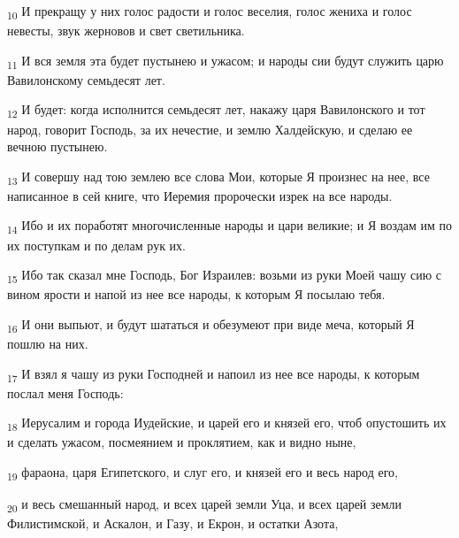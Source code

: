 \begin{tcolorbox}
\textsubscript{10} И прекращу у них голос радости и голос веселия, голос жениха и голос невесты, звук жерновов и свет светильника.
\end{tcolorbox}
\begin{tcolorbox}
\textsubscript{11} И вся земля эта будет пустынею и ужасом; и народы сии будут служить царю Вавилонскому семьдесят лет.
\end{tcolorbox}
\begin{tcolorbox}
\textsubscript{12} И будет: когда исполнится семьдесят лет, накажу царя Вавилонского и тот народ, говорит Господь, за их нечестие, и землю Халдейскую, и сделаю ее вечною пустынею.
\end{tcolorbox}
\begin{tcolorbox}
\textsubscript{13} И совершу над тою землею все слова Мои, которые Я произнес на нее, все написанное в сей книге, что Иеремия пророчески изрек на все народы.
\end{tcolorbox}
\begin{tcolorbox}
\textsubscript{14} Ибо и их поработят многочисленные народы и цари великие; и Я воздам им по их поступкам и по делам рук их.
\end{tcolorbox}
\begin{tcolorbox}
\textsubscript{15} Ибо так сказал мне Господь, Бог Израилев: возьми из руки Моей чашу сию с вином ярости и напой из нее все народы, к которым Я посылаю тебя.
\end{tcolorbox}
\begin{tcolorbox}
\textsubscript{16} И они выпьют, и будут шататься и обезумеют при виде меча, который Я пошлю на них.
\end{tcolorbox}
\begin{tcolorbox}
\textsubscript{17} И взял я чашу из руки Господней и напоил из нее все народы, к которым послал меня Господь:
\end{tcolorbox}
\begin{tcolorbox}
\textsubscript{18} Иерусалим и города Иудейские, и царей его и князей его, чтоб опустошить их и сделать ужасом, посмеянием и проклятием, как и видно ныне,
\end{tcolorbox}
\begin{tcolorbox}
\textsubscript{19} фараона, царя Египетского, и слуг его, и князей его и весь народ его,
\end{tcolorbox}
\begin{tcolorbox}
\textsubscript{20} и весь смешанный народ, и всех царей земли Уца, и всех царей земли Филистимской, и Аскалон, и Газу, и Екрон, и остатки Азота,
\end{tcolorbox}

